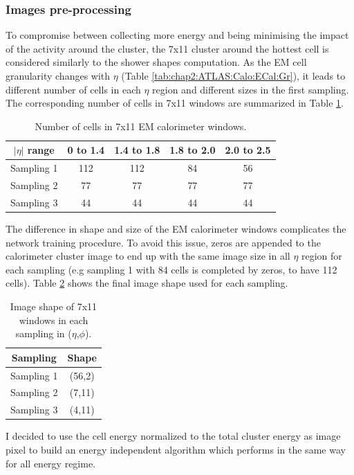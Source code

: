 \subsubsection{Images pre-processing}
\label{gamma:CNN:PreProcessing}
To compromise between collecting more energy and being minimising the impact of the activity around the cluster, the 7x11 cluster around the hottest cell is considered similarly to the shower shapes computation. As the EM cell granularity changes with $\eta$ (Table \ref{tab:chap2:ATLAS:Calo:ECal:Gr}), it leads to different number of cells in each $\eta$ region and different sizes in the first sampling. The corresponding number of cells in 7x11 windows are summarized in Table \ref{tab:gamma:CNN:PreProcessing:NCells}.
\begin{table}[H]
    \centering
    \begin{tabular}{ccccc}
    \hline
        $|\eta|$ range & 0 to 1.4 & 1.4 to 1.8 & 1.8 to 2.0 & 2.0 to 2.5 \\
    \hline
        Sampling 1 & 112 & 112 & 84 & 56 \\
        Sampling 2 & 77 & 77 & 77 & 77 \\
        Sampling 3 & 44 & 44 & 44 & 44 \\
    \hline
    \end{tabular}
    \caption{Number of cells in 7x11 EM calorimeter windows.}
    \label{tab:gamma:CNN:PreProcessing:NCells}
\end{table}
The difference in shape and size of the EM calorimeter windows complicates the network training procedure. To avoid this issue, zeros are appended to the calorimeter cluster image to end up with the same image size in all $\eta$ region for each sampling (e.g sampling 1 with 84 cells is completed by zeros, to have 112 cells). Table \ref{tab:gamma:CNN:PreProcessing:ImgSize} shows the final image shape used for each sampling.
\begin{table}[H]
    \centering
    \begin{tabular}{cc}
    \hline
        Sampling & Shape \\
    \hline
        Sampling 1 & (56,2)\\
        Sampling 2 & (7,11)  \\
        Sampling 3 & (4,11) \\
    \hline
    \end{tabular}
    \caption{Image shape of 7x11 windows in each sampling in ($\eta$,$\phi$).}
    \label{tab:gamma:CNN:PreProcessing:ImgSize}
\end{table}
I decided to use the cell energy normalized to the total cluster energy as image pixel to build an energy independent algorithm which performs in the same way for all energy regime.
